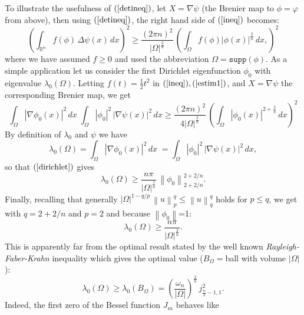 \documentclass[12pt,a4paper]{article}
\newcommand{\norm}[1]{\left\lVert#1\right\rVert}
\newcommand{\RR}[1]{\mathbb{R}^#1}
\begin{document}
\begin{appendices}
To illustrate the usefulness of $(\ref{detineq})$, let $X=\nabla\psi$ (the Brenier map to $\phi=\varphi$ from above), then using $(\ref{detineq})$, the right hand side of $(\ref{ineq})$ becomes:
%
\begin{equation}\label{estim1}
   \left(\int_{\RR n} f(\phi)\, \Delta\psi(x) \, dx\right)^2 \geq
    \frac{(2 \pi n)^2}{|\Omega|^\frac{2}{n}}\,
       \left( \int_{\Omega} f(\phi) |\phi(x)|^\frac{2}{n} \,dx, \right)^2
\end{equation}
%
where we have assumed $f\geq 0$ and used the abbreviation 
$\Omega=\mathtt{supp}(\phi)$.  
As a simple application let us consider the first Dirichlet eigenfunction $\phi_0$
with eigenvalue $\lambda_0(\Omega)$. Letting $f(t)=\frac{1}{2} t^2$ in 
$(\ref{ineq}),(\ref{estim1})$, and $X=\nabla\psi$ the corresponding Brenier map, 
we get
%
\begin{equation}\label{dirichlet}
     \int_{\Omega} |\nabla\phi_0(x)|^2\,dx \; 
     \int_{\Omega} |\phi_0|^2\, |\nabla\psi(x)|^2 \, dx \geq    
      \frac{(2 \pi n)^2}{4 |\Omega|^\frac{2}{n}}\,
       \left( \int_{\Omega} |\phi_0(x)|^{2+\frac{2}{n}} \,dx\right)^2
\end{equation}
By definition of $\lambda_0$ and $\psi$ we have 
%
\begin{displaymath}
    \lambda_0(\Omega)=\int_{\Omega} |\nabla\phi_0(x)|^2\,dx \;  =
     \int_{\Omega} |\phi_0|^2\, |\nabla\psi(x)|^2 \, dx ,
\end{displaymath}
so that $(\ref{dirichlet})$ gives
%
\begin{displaymath}
 \lambda_0(\Omega) \geq \frac{n \pi}{|\Omega|^\frac{1}{n}} 
    \, \norm{\phi_0}_{2+2/n}^{2+2/n}.
\end{displaymath}
Finally, recalling that generally $|\Omega|^{1-q/p}\,\norm{u}_p^q\leq \norm{u}_q^q$ holds for $p\leq q$, we get with $q=2+2/n$ and $p=2$ and because $\norm{\phi_0}$=1:    
%
\begin{equation}\label{lbound}
        \lambda_0(\Omega) \geq \frac{n \pi}{|\Omega|^\frac{2}{n}}. 
\end{equation}
This is apparently far from the optimal result stated by the well known 
{\sl Rayleigh-Faber-Krahn} inequality which gives the optimal value 
($B_\Omega=$ball with volume $|\Omega|$):
\begin{displaymath}
    \lambda_0(\Omega)\geq \lambda_0(B_\Omega)= 
      \left(\frac{\omega_n}{|\Omega|}\right)^\frac{2}{n}\, j_{\frac{n}{2}-1,1}^2.
\end{displaymath}
%
Indeed, the first zero of the Bessel function $J_m$ behaves like 

\end{appendices}
\end{document}

